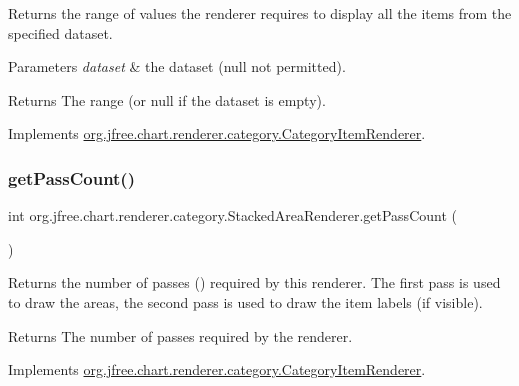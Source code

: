 Returns the range of values the renderer requires to display all the items from the specified dataset.


\begin{DoxyParams}{Parameters}
{\em dataset} & the dataset ({\ttfamily null} not permitted).\\
\hline
\end{DoxyParams}
\begin{DoxyReturn}{Returns}
The range (or {\ttfamily null} if the dataset is empty). 
\end{DoxyReturn}


Implements \mbox{\hyperlink{interfaceorg_1_1jfree_1_1chart_1_1renderer_1_1category_1_1_category_item_renderer_aa7294c25a26ffd1725d7920a6041a785}{org.\+jfree.\+chart.\+renderer.\+category.\+Category\+Item\+Renderer}}.

\mbox{\label{classorg_1_1jfree_1_1chart_1_1renderer_1_1category_1_1_stacked_area_renderer_a973bdba1de70a34fcf8f3690d0f91897}} 
\subsubsection{\texorpdfstring{get\+Pass\+Count()}{getPassCount()}}
{\footnotesize\ttfamily int org.\+jfree.\+chart.\+renderer.\+category.\+Stacked\+Area\+Renderer.\+get\+Pass\+Count (\begin{DoxyParamCaption}{ }\end{DoxyParamCaption})}

Returns the number of passes ({}) required by this renderer. The first pass is used to draw the areas, the second pass is used to draw the item labels (if visible).

\begin{DoxyReturn}{Returns}
The number of passes required by the renderer. 
\end{DoxyReturn}


Implements \mbox{\hyperlink{interfaceorg_1_1jfree_1_1chart_1_1renderer_1_1category_1_1_category_item_renderer_aa8cd580a0e3836808f97f479f2c999bc}{org.\+jfree.\+chart.\+renderer.\+category.\+Category\+Item\+Renderer}}.

